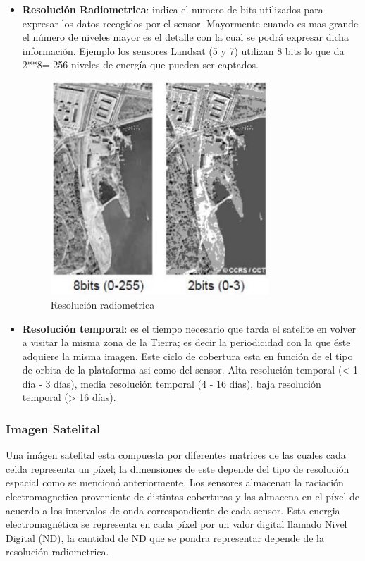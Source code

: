 \begin{itemize}
\item \textbf{Resolución Radiometrica}: indica el numero de bits utilizados para expresar los datos recogidos por el sensor. Mayormente cuando es mas grande el número de niveles mayor es el detalle con la cual se podrá expresar dicha información. Ejemplo los sensores Landsat (5 y 7) utilizan 8 bits lo que da 2**8= 256 niveles de energía que pueden ser captados.
\begin{figure}[H] \centering
  \includegraphics[height=8cm,keepaspectratio=true,clip=true]{imagenes/MarcoTeorico/resolucion_radiometrica.png}
  \caption{Resolución radiometrica}\label{Fig:resolucion-radiometrica}
\end{figure}

\item \textbf{Resolución temporal}: es el tiempo necesario que tarda el satelite en volver a visitar la misma zona de la Tierra; es decir la periodicidad con la que éste adquiere la misma imagen. Este ciclo de cobertura esta en función de el tipo de orbita de la plataforma asi como del sensor. Alta resolución temporal (< 1 día - 3 días), media resolución temporal (4 - 16 días), baja resolución temporal (> 16 días).

\end{itemize}

\subsubsection{Imagen Satelital}
Una imágen satelital esta compuesta por diferentes matrices de las cuales cada celda representa un píxel; la dimensiones de este depende del tipo de resolución espacial como se mencionó anteriormente. Los sensores almacenan la raciación electromagnetica proveniente de distintas coberturas y las almacena en el píxel de acuerdo a los intervalos de onda correspondiente de cada sensor. Esta energia electromagnética se representa en cada píxel por un valor digital llamado Nivel Digital (ND), la cantidad de ND que se pondra representar depende de la resolución radiometrica.

